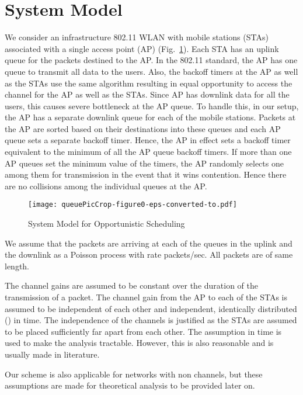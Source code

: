 \documentclass[10pt,conference]{IEEEtran}
\begin{document}
\section{System Model}
\label{sec:sysmodel}



 We consider an infrastructure 802.11 WLAN with  mobile stations (STAs) associated with a single access point (AP) (Fig.~\ref{fig:sys_opp}).
 Each STA has an uplink queue for the packets destined to the AP. 
In the 802.11 standard, the AP has one queue to transmit all data to the users. 
Also, the backoff timers at the AP as well as the STAs use the same algorithm resulting in equal opportunity to access the channel for the AP as well as the STAs.
Since AP has downlink data for all the users, this causes severe bottleneck at the AP queue. 
To handle this, in our setup, the AP has a separate downlink queue for each of the mobile stations.
Packets at the AP are sorted based on their destinations into these queues and each AP queue sets a separate backoff timer.
Hence, the AP in effect sets a backoff timer equivalent to the minimum of all the AP queue backoff timers. 
If more than one AP queues set the minimum value of the timers, the AP randomly selects one among them for transmission in the event that it wins contention. 
Hence there are no collisions among the individual queues at the AP.

\begin{figure}[!h]
 \centering
 \texttt{[image: queuePicCrop-figure0-eps-converted-to.pdf]}
\caption{System Model for Opportunistic Scheduling}
\label{fig:sys_opp}
\end{figure}

We assume that the packets are arriving at each of the queues in the uplink and the downlink as a Poisson process with rate  packets/sec. All packets are of same length.

The channel gains are assumed to be constant over the duration of the transmission of a packet.
 The channel gain from the AP to each of the STAs is assumed to be independent of each other and independent, identically distributed () in time. 
 The independence of the channels is justified as the STAs are assumed to be placed sufficiently far apart from each other. 
The  assumption in time is used to make the analysis tractable. However, this is also reasonable and is usually made in literature.

Our scheme is also applicable for networks with non  channels, but these assumptions are made for theoretical analysis to be provided later on.
\end{document}
